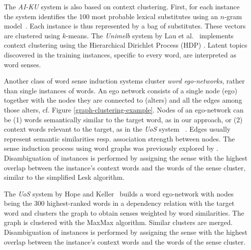 \documentclass[11pt]{article}
\begin{document}
The \emph{AI-KU} system \cite{Baskaya2013} is also based on context clustering. First, for each instance the system identifies the 100 most probable lexical substitutes using an $n$-gram model~\cite{Yuret2012}. Each instance is thus represented by a bag of substitutes. These vectors are clustered using $k$-means. The \emph{Unimelb} system by Lau et al.~ implements context clustering using the Hierarchical Dirichlet Process (HDP) \cite{Teh2006}. Latent topics discovered in the training instances, specific to every word, are interpreted as word senses.  

Another class of word sense induction systems cluster \textit{word ego-networks}, rather than single instances of words. An ego network consists of a single node (ego) together with the nodes they are connected to (alters) and all the edges among those alters, cf. Figure \ref{graph-clustering-example}.  Nodes of an ego-network can  be (1) words semantically similar to the target word, as in our approach, or (2) context words relevant to the target, as in the \textit{UoS} system ~\cite{Hope2013}. Edges usually represent semantic similarities resp. association strength between nodes. The sense induction process using word graphs was previously explored by  \cite{Widdows2002,Biemann2010,Hope2013}. Disambiguation of instances is performed by assigning the sense with the highest overlap between the instance's context words and the words of the sense cluster, similar to the simplified Lesk algorithm.



The \emph{UoS} system by Hope and Keller~ builds a word ego-network with nodes being the 300 highest-ranked words in a dependency relation with the target word and clusters the graph to obtain senses weighted by word similarities. The graph is clustered with the MaxMax algorithm. Similar clusters are merged. Disambiguation of instances is performed by assigning the sense with the highest overlap between the instance's context words and the words of the sense cluster. 
\end{document}
